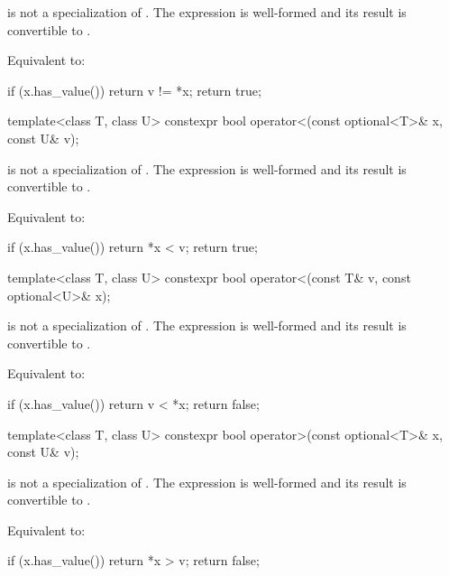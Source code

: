 \begin{itemdescr}
\pnum
\constraints
{} is not a specialization of .
The expression  is well-formed and
its result is convertible to .

\pnum
\effects
Equivalent to:
\begin{codeblock}
if (x.has_value())
  return v != *x;
return true;
\end{codeblock}
\end{itemdescr}

%
\begin{itemdecl}
template<class T, class U> constexpr bool operator<(const optional<T>& x, const U& v);
\end{itemdecl}

\begin{itemdescr}
\pnum
\constraints
{} is not a specialization of .
The expression  is well-formed and
its result is convertible to .

\pnum
\effects
Equivalent to:
\begin{codeblock}
if (x.has_value())
  return *x < v;
return true;
\end{codeblock}
\end{itemdescr}

%
\begin{itemdecl}
template<class T, class U> constexpr bool operator<(const T& v, const optional<U>& x);
\end{itemdecl}

\begin{itemdescr}
\pnum
\constraints
{} is not a specialization of .
The expression  is well-formed and
its result is convertible to .

\pnum
\effects
Equivalent to:
\begin{codeblock}
if (x.has_value())
  return v < *x;
return false;
\end{codeblock}
\end{itemdescr}

%
\begin{itemdecl}
template<class T, class U> constexpr bool operator>(const optional<T>& x, const U& v);
\end{itemdecl}

\begin{itemdescr}
\pnum
\constraints
{} is not a specialization of .
The expression  is well-formed and
its result is convertible to .

\pnum
\effects
Equivalent to:
\begin{codeblock}
if (x.has_value())
  return *x > v;
return false;
\end{codeblock}
\end{itemdescr}

